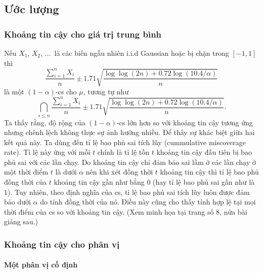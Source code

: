 \subsection{Ước lượng}

\subsubsection{Khoảng tin cậy cho giá trị trung bình}

\begin{exmp}
  Nếu $X_1$, $X_2$, $\ldots\,$ là các biến ngẫu nhiên i.i.d Gaussian hoặc bị
  chặn trong $[-1, 1]$ thì \begin{equation}
    \frac{ \sum_{i = 1}^n X_i }{ n } \pm 1.71 \sqrt{ \frac{ \log\log(2n) + 0.72
    \log ( 10.4 / \alpha ) }{ n } }
  \end{equation} là một $(1 - \alpha)$-\gls{cs} cho $\mu$, tương tự
  như \begin{equation}
    \bigcap_{s \le n} \frac{ \sum_{i = 1}^n X_i }{ n } \pm 1.71 \sqrt{ \frac{
      \log\log(2n) + 0.72 \log ( 10.4 / \alpha ) }{ n } }.
  \end{equation}
  Ta thấy rằng, độ rộng của $(1 - \alpha)$-\gls{cs} lớn hơn so với
  khoảng tin cậy tương ứng nhưng chênh lệch không thực sự ảnh hưởng nhiều. Để
  thấy sự khác biệt giữa hai kết quả này. Ta dùng đến tỉ lệ bao phủ sai tích
  lũy (cummulative miscoverage rate). Tỉ lệ này ứng với mỗi $t$ chính là tỉ lệ
  tồn $t$ khoảng tin cậy đầu tiên bị bao phủ sai với các lần chạy. Do khoảng
  tin cậy chỉ đảm bảo sai lầm ở các lần chạy ở một thời điểm $t$ là dưới
  $\alpha$ nên khi xét đồng thời $t$ khoảng tin cậy thì tỉ lệ bao phủ đồng thời
  của $t$ khoảng tin cậy gần như bằng $0$ (hay tỉ lệ bao phủ sai gần như là
  $1$). Tuy nhiên, theo định nghĩa của \gls{cs}, tỉ lệ bao phủ sai
  tích lũy luôn được đảm bảo dưới $\alpha$ do tính đồng thời của nó. Điều này
  cũng cho thấy tính hợp lệ tại mọi thời điểm của \gls{cs} so với
  khoảng tin cậy. (Xem minh họa tại trang số 8, nửa bài giảng sau.)
\end{exmp}

\subsubsection{Khoảng tin cậy cho phân vị}

\paragraph{Một phân vị cố định}

